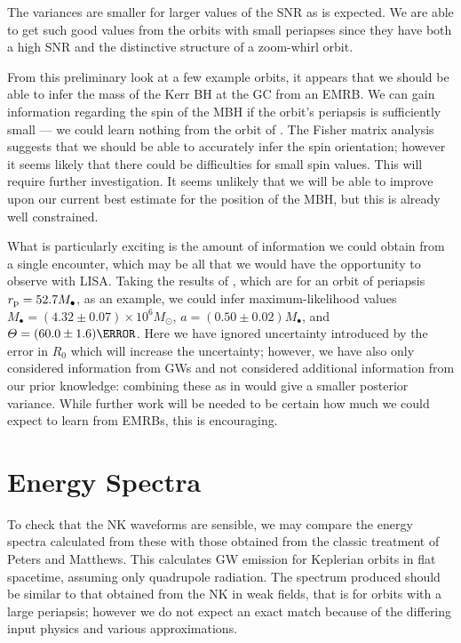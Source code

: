 The variances are smaller for larger values of the SNR as is expected. We are able to get such good values from the orbits with small periapses since they have both a high SNR and the distinctive structure of a zoom-whirl orbit.

From this preliminary look at a few example orbits, it appears that we should be able to infer the mass of the Kerr BH at the GC from an EMRB. We can gain information regarding the spin of the MBH if the orbit's periapsis is sufficiently small --- we could learn nothing from the orbit of . The Fisher matrix analysis suggests that we should be able to accurately infer the spin orientation; however it seems likely that there could be difficulties for small spin values. This will require further investigation. It seems unlikely that we will be able to improve upon our current best estimate for the position of the MBH, but this is already well constrained.

What is particularly exciting is the amount of information we could obtain from a single encounter, which may be all that we would have the opportunity to observe with LISA. Taking the results of , which are for an orbit of periapsis $r_\mathrm{p} = 52.7 M_\bullet$, as an example, we could infer maximum-likelihood values $M_\bullet = (4.32 \pm 0.07) \times 10^6 M_\odot$, $a = (0.50{} \pm {}0.02) M_\bullet$, and $\Theta = {(60.0 \pm 1.6)\degree}$. Here we have ignored uncertainty introduced by the error in $R_0$ which will increase the uncertainty; however, we have also only considered information from GWs and not considered additional information from our prior knowledge: combining these as in  would give a smaller posterior variance. While further work will be needed to be certain how much we could expect to learn from EMRBs, this is encouraging.

\section{Energy Spectra}

To check that the NK waveforms are sensible, we may compare the energy spectra calculated from these with those obtained from the classic treatment of Peters and Matthews\cite{Peters1963, Peters1964}. This calculates GW emission for Keplerian orbits in flat spacetime, assuming only quadrupole radiation. The spectrum produced should be similar to that obtained from the NK in weak fields, that is for orbits with a large periapsis; however we do not expect an exact match because of the differing input physics and various approximations.

